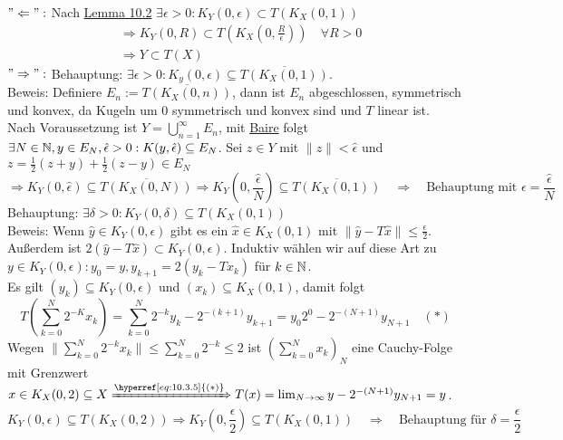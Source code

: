 \begin{beweis}
	$"\Leftarrow":$ Nach \hyperref[lemma:10.2]{Lemma 10.2} $\exists \epsilon > 0: K_{Y}(0, \epsilon) \subset T(K_{X}(0, 1)) $
	\begin{align*}
		& \Rightarrow K_{Y}(0, R) \subset T(K_{X}(0, \frac{R}{\epsilon})) \quad \forall R > 0 \\
		& \Rightarrow Y \subset T(X)
	\end{align*}
	$"\Rightarrow":$ Behauptung: $\exists \epsilon > 0: K_{y}(0, \epsilon) \subseteq \overline{T(K_{X}(0,1))}$. \\
	Beweis: Definiere $E_{n} := \overline{T(K_{X}(0, n))}$, dann ist $E_{n}$ abgeschlossen, symmetrisch und konvex, da Kugeln um $0$ symmetrisch und konvex sind und $T$ linear ist. \\
	Nach Voraussetzung ist $Y = \bigcup_{n = 1}^{\infty} E_{n}$, mit \hyperref[satz:9.1-baire]{Baire} folgt $\exists N \in \mathbb{N}, y \in E_{N}, \hat \epsilon > 0: K(y, \hat \epsilon) \subseteq E_{N}$. Sei $z \in Y$ mit $\| z \| < \hat \epsilon$ und $z = \frac{1}{2} (z + y) + \frac{1}{2} (z - y) \in E_{N}$
		\[ \Rightarrow K_{Y}(0, \hat \epsilon) \subseteq \overline{T(K_{X}(0, N))} \Rightarrow K_{Y}(0, \frac{\hat \epsilon}{N}) \subseteq \overline{T(K_{X}(0, 1))} \quad \Rightarrow \quad \text{Behauptung mit } \epsilon = \frac{\hat \epsilon}{N}  \]
		Behauptung: $\exists \delta > 0: K_{Y}(0, \delta) \subseteq T(K_{X}(0, 1))$ \\
		Beweis: Wenn $\hat y \in K_{Y}(0, \epsilon)$ gibt es ein $\hat x \in K_{X}(0, 1)$ mit $\| \hat y - T \hat x \| \leq \frac{\epsilon}{2}$. \\
		Au{\ss}erdem ist $2 (\hat y - T \hat x) \subset K_{Y}(0, \epsilon)$. Induktiv wählen wir auf diese Art zu $y \in K_{Y}(0, \epsilon): y_{0} = y, y_{k + 1} = 2 ( y_{k} - T x_{k})$ für $k \in \mathbb{N}$. \\
		Es gilt $(y_{k}) \subseteq K_{Y}(0, \epsilon)$ und $(x_{k}) \subseteq K_{X}(0, 1)$, damit folgt
		\[ T \left( \sum_{k = 0}^{N} 2^{-K} x_{k} \right) = \sum_{k = 0}^{N} 2^{-k} y_{k} - 2^{-(k+1)} y_{k+1} = y_{0} 2^{0} - 2^{-(N+1)} y_{N+1} \quad (*) \label{eq:10.3.5} \]
		Wegen $\| \sum_{k = 0}^{N} 2^{-k} x_{k} \| \leq \sum_{k = 0}^{N} 2^{-k} \leq 2$ ist $\left( \sum_{k = 0}^{N} x_{k} \right)_{N}$ eine Cauchy-Folge mit Grenzwert $x \in K_{X}(0, 2) \subseteq X \xRightarrow[]{\hyperref[eq:10.3.5]{(*)}} T(x) = \lim_{N \rightarrow \infty} y - 2^{-(N+1)} y_{N+1} = y$. 
		\[ K_{Y} \left( 0, \epsilon \right) \subseteq T \left( K_{X}(0, 2) \right) \Rightarrow K_{Y} \left( 0, \frac{\epsilon}{2} \right) \subseteq T \left( K_{X}(0, 1) \right) \quad \Rightarrow \quad \text{Behauptung für } \delta = \frac{\epsilon}{2} \]
\end{beweis}


